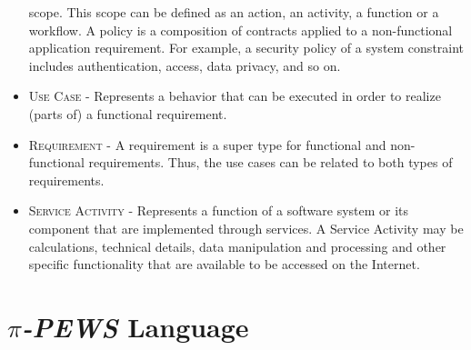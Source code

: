 \begin{itemize}
  scope. This scope can be defined as an action, an activity, a function or a
  workflow. A policy is a composition of contracts applied to a non-functional
  application requirement. For example, a security policy of a system constraint
  includes authentication, access, data privacy, and so on.
 \item \textsc{Use Case -} Represents a behavior that can be executed
in order to realize (parts of) a functional requirement.
  \item \textsc{Requirement -} A requirement is a super type for functional and
  non-functional requirements. Thus, the use cases can be related to both types
  of requirements.
  \item \textsc{Service Activity -} Represents a function of a software
  system or its component that are implemented through services. A Service
  Activity may be calculations, technical details, data manipulation and
  processing and other specific functionality that are available to be accessed
  on the Internet.
  \end{itemize}


\chapter{\textit{$\pi$-PEWS} Language}
\label{append:pews_language}


